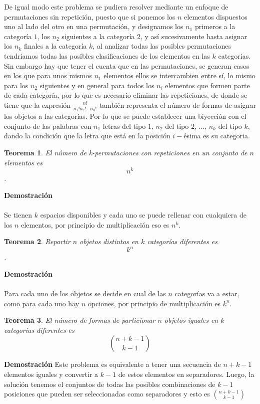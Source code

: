 \documentclass[a4paper,12pt]{report}
\newtheorem*{teo}{Teorema}
\begin{document}
De igual modo este problema se pudiera resolver mediante un enfoque de permutaciones sin repetici\'on, puesto que si ponemos los $n$ elementos dispuestos uno al lado del otro en una permutaci\'on, y designamos los $n_1$ primeros a la categor\'ia $1$, los $n_2$ siguientes a la categor\'ia $2$, y as\'i sucesivamente hasta asignar los $n_k$ finales a la categor\'ia $k$, al analizar todas las posibles permutaciones tendr\'iamos todas las posibles clasificaciones de los elementos en las $k$ categor\'ias.
Sin embargo hay que tener el cuenta que en las permutaciones, se generan casos en los que para unos mismos $n_1$ elementos ellos se intercambien entre s\'i, lo mismo para los $n_2$ siguientes y en general para todos los $n_i$ elementos que formen parte de cada categor\'ia, por lo que es necesario eliminar las repeticiones, de donde se tiene que la expresi\'on $\frac{n!}{n_1!n_2!\dots n_k!}$ tambi\'en representa el n\'umero de formas de asignar los objetos a las categor\'ias. Por lo que se puede establecer una biyecci\'on con el conjunto de las palabras con $n_1$ letras del tipo $1$, $n_2$ del tipo $2$, ..., $n_k$ del tipo $k$, dando la condici\'on que la letra que est\'a en la posici\'on $i-$\'esima es su categoria.
 
\begin{teo}
    El n\'umero de k-permutaciones con repeticiones en un conjunto de $n$ elementos es $$n^k$$.
\end{teo}

\textbf{Demostración}\\\\
Se tienen $k$ espacios disponibles y cada uno se puede rellenar con cualquiera de los $n$ elementos, por principio de multiplicaci\'on eso es $n^k$.

\begin{teo}
    Repartir $n$ objetos distintos en $k$ categor\'ias diferentes es $$k^n$$.
\end{teo}

\textbf{Demostración}\\\\
Para cada uno de los objetos se decide en cual de las $n$ categor\'ias va a estar, como para cada uno hay $n$ opciones, por principio de multiplicaci\'on es $k^n$.

\begin{teo}
 El número de formas de particionar $n$ objetos iguales en $k$ categorías diferentes es $$\binom{n+k-1}{k-1}$$
\end{teo}


\textbf{Demostración}
Este problema es equivalente a tener una secuencia de $n+k-1$ elementos iguales y convertir a $k-1$ de estos elementos en separadores. Luego, la solución tenemos el conjuntos de todas las posibles combinaciones de $k-1$ posiciones que pueden ser seleccionadas como separadores y esto es ${n+k-1}\choose{k-1}$
\end{document}
